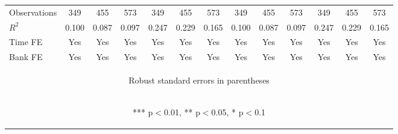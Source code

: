 \documentclass[]{article}
\begin{document}
\begin{center}
\begin{tabular}{lcccccccccccc}
Observations & 349 & 455 & 573 & 349 & 455 & 573 & 349 & 455 & 573 & 349 & 455 & 573 \\
$R^2$ & 0.100 & 0.087 & 0.097 & 0.247 & 0.229 & 0.165 & 0.100 & 0.087 & 0.097 & 0.247 & 0.229 & 0.165 \\
Time FE & Yes & Yes & Yes & Yes & Yes & Yes & Yes & Yes & Yes & Yes & Yes & Yes \\
 Bank FE & Yes & Yes & Yes & Yes & Yes & Yes & Yes & Yes & Yes & Yes & Yes & Yes \\ \hline
\multicolumn{13}{c}{\begin{footnotesize} Robust standard errors in parentheses\end{footnotesize}} \\
\multicolumn{13}{c}{\begin{footnotesize} *** p$<$0.01, ** p$<$0.05, * p$<$0.1\end{footnotesize}} \\
\end{tabular}
\end{center}
\end{document}
